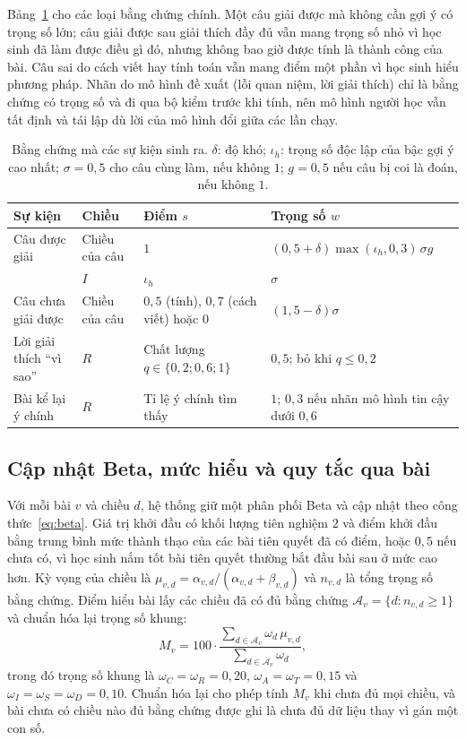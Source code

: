 Bảng~\ref{tab:evidence} cho các loại bằng chứng chính. Một câu giải được mà không cần gợi ý có trọng số lớn; câu giải được sau giải thích đầy đủ vẫn mang trọng số nhỏ vì học sinh đã làm được điều gì đó, nhưng không bao giờ được tính là thành công của bài. Câu sai do cách viết hay tính toán vẫn mang điểm một phần vì học sinh hiểu phương pháp. Nhãn do mô hình đề xuất (lỗi quan niệm, lời giải thích) chỉ là bằng chứng có trọng số và đi qua bộ kiểm trước khi tính, nên mô hình người học vẫn tất định và tái lập dù lời của mô hình đổi giữa các lần chạy.

\begin{table}[H]
\centering
\caption{Bằng chứng mà các sự kiện sinh ra. $\delta$: độ khó; $\iota_h$: trọng số độc lập của bậc gợi ý cao nhất; $\sigma=0{,}5$ cho câu cùng làm, nếu không $1$; $g=0{,}5$ nếu câu bị coi là đoán, nếu không $1$.}\label{tab:evidence}
\small
\begin{tabular}{>{\raggedright\arraybackslash}p{4.4cm}>{\raggedright\arraybackslash}p{1.9cm}>{\raggedright\arraybackslash}p{3.0cm}>{\raggedright\arraybackslash}p{4.4cm}}
\toprule
Sự kiện & Chiều & Điểm $s$ & Trọng số $w$ \\
\midrule
Câu được giải & Chiều của câu & $1$ & $(0{,}5+\delta)\max(\iota_h,0{,}3)\,\sigma g$ \\
 & $I$ & $\iota_h$ & $\sigma$ \\
Câu chưa giải được & Chiều của câu & $0{,}5$ (tính), $0{,}7$ (cách viết) hoặc $0$ & $(1{,}5-\delta)\sigma$ \\
Lời giải thích ``vì sao'' & $R$ & Chất lượng $q\in\{0{,}2;0{,}6;1\}$ & $0{,}5$; bỏ khi $q\le0{,}2$ \\
Bài kể lại ý chính & $R$ & Tỉ lệ ý chính tìm thấy & $1$; $0{,}3$ nếu nhãn mô hình tin cậy dưới $0{,}6$ \\
\bottomrule
\end{tabular}
\end{table}

\subsection{Cập nhật Beta, mức hiểu và quy tắc qua bài}
Với mỗi bài $v$ và chiều $d$, hệ thống giữ một phân phối Beta và cập nhật theo công thức~\eqref{eq:beta}. Giá trị khởi đầu có khối lượng tiên nghiệm $2$ và điểm khởi đầu bằng trung bình mức thành thạo của các bài tiên quyết đã có điểm, hoặc $0{,}5$ nếu chưa có, vì học sinh nắm tốt bài tiên quyết thường bắt đầu bài sau ở mức cao hơn. Kỳ vọng của chiều là $\mu_{v,d}=\alpha_{v,d}/(\alpha_{v,d}+\beta_{v,d})$ và $n_{v,d}$ là tổng trọng số bằng chứng. Điểm hiểu bài lấy các chiều đã có đủ bằng chứng $\mathcal{A}_v=\{d:n_{v,d}\ge1\}$ và chuẩn hóa lại trọng số khung:
\begin{equation}
M_v=100\cdot\frac{\sum_{d\in\mathcal{A}_v}\omega_d\,\mu_{v,d}}{\sum_{d\in\mathcal{A}_v}\omega_d},
\label{eq:mastery}
\end{equation}
trong đó trọng số khung là $\omega_C=\omega_R=0{,}20$, $\omega_A=\omega_T=0{,}15$ và $\omega_I=\omega_S=\omega_D=0{,}10$.
Chuẩn hóa lại cho phép tính $M_v$ khi chưa đủ mọi chiều, và bài chưa có chiều nào đủ bằng chứng được ghi là chưa đủ dữ liệu thay vì gán một con số.

